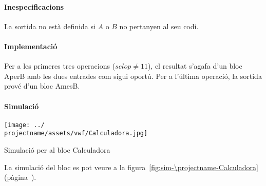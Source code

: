 \paragraph{Inespecificacions}


La sortida no està definida si $A$ o $B$ no pertanyen al seu codi.


\paragraph{Implementació}




Per a les primeres tres operacions ($selop \neq 11$), el resultat s'agafa d'un
bloc \textsf{AperB} amb les dues entrades com sigui oportú. Per a l'última operació,
la sortida prové d'un bloc \textsf{AmesB}.

\paragraph{Simulació}

\begin{contendfig}
  \begin{center}
    \texttt{[image: ../\\projectname/assets/vwf/Calculadora.jpg]}
  \end{center}
  \caption{\label{fig:sim-\projectname-Calculadora} Simulació per al bloc \textsf{Calculadora}}
\end{contendfig}

La simulació del bloc es pot veure a la figura~\ref{fig:sim-\projectname-Calculadora} (pàgina~\pageref{fig:sim-\projectname-Calculadora}).


\vspace{1cm}
